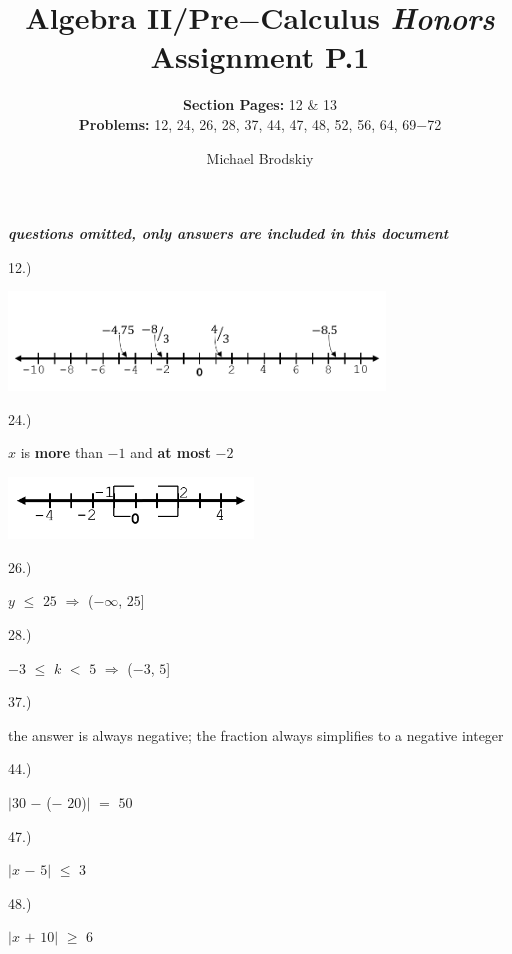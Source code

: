 \documentclass[12pt]{article}
\title{\textbf{Algebra II/Pre$-$Calculus \textit{Honors}}  \\ Assignment P.1}
\date{}
\subtitle{\textbf{Section Pages:} 12 \& 13\\\textbf{Problems:} 12, 24, 26, 28, 37, 44, 47, 48, 52, 56, 64, 69$-$72}
\author{Michael Brodskiy}
\begin{document}
\maketitle
\begin{center} \textbf{\textit{questions omitted, only answers are included in this document\\}} \end{center} 
{\setlength{\parindent}{0cm}
12.) 
    \begin{center} \includegraphics[width=100mm]{number_line.png} \end{center}
}
{\setlength{\parindent}{0cm}
24.) 
    \begin{center} $x$ is \textbf{more} than $-1$ and \textbf{at most} $-2$ \end{center}
    \begin{center} \includegraphics[width=65mm]{line_segment.png} \end{center}
}
{\setlength{\parindent}{0cm}
26.) 
    \begin{center} $y$ $\leq$ $25$ $\Longrightarrow$ ($-\infty$, $25$] \end{center}
}
{\setlength{\parindent}{0cm}
28.)
    \begin{center} $-3$ $\leq$ $k$ $<$ $5$ $\Longrightarrow$ ($-3$, $5$] \end{center}
}
{\setlength{\parindent}{0cm}
37.) 
    \begin{center} the answer is always negative; the fraction always simplifies to a negative integer \end{center}
}
{\setlength{\parindent}{0cm}
44.) 
    \begin{center} $|30$ $-$ ($-$ $20$)$|$ $=$ $50$ \end{center}
}
{\setlength{\parindent}{0cm}
47.) 
    \begin{center} $|x$ $-$ $5|$ $\leq$ $3$ \end{center}
}
{\setlength{\parindent}{0cm}
48.) 
    \begin{center} $|x$ $+$ $10|$ $\geq$ $6$ \end{center}
}
\end{document}
